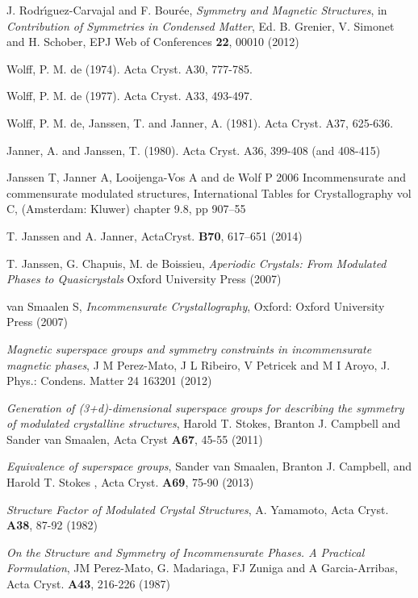 \documentclass[10pt]{article}
\begin{document}
\begin{thebibliography}{999}
	 J. Rodr\'{\i}guez-Carvajal and F. Bour\'ee, {\it Symmetry and Magnetic Structures}, in {\it Contribution of Symmetries in Condensed Matter}, Ed. B. Grenier, V. Simonet and H. Schober, EPJ Web of Conferences {\bf 22}, 00010 (2012)%

 Wolff, P. M. de (1974). Acta Cryst. A30, 777-785.

 Wolff, P. M. de (1977). Acta Cryst. A33, 493-497.

 Wolff, P. M. de, Janssen, T. and Janner, A. (1981). Acta Cryst. A37, 625-636.

   Janner, A. and Janssen, T. (1980). Acta Cryst. A36, 399-408 (and 408-415)


  Janssen T, Janner A, Looijenga-Vos A and de Wolf P 2006
Incommensurate and commensurate modulated structures, International Tables for Crystallography vol C,
(Amsterdam: Kluwer) chapter 9.8, pp 907–55

 T. Janssen and A. Janner,  ActaCryst.  {\bf B70}, 617–651 (2014)

 T. Janssen, G. Chapuis, M. de Boissieu, {\it Aperiodic Crystals:  From Modulated Phases to Quasicrystals} Oxford University Press (2007)

 van Smaalen S, {\it Incommensurate Crystallography}, Oxford: Oxford University Press (2007)

 {\it Magnetic superspace groups and symmetry constraints in incommensurate magnetic phases}, J M Perez-Mato, J L Ribeiro, V Petricek and M I Aroyo,  J. Phys.: Condens. Matter 24
163201 (2012)

 {\it Generation of (3+d)-dimensional superspace groups for describing the symmetry of modulated crystalline structures}, Harold T. Stokes, Branton J. Campbell and Sander van Smaalen, Acta Cryst {\bf A67}, 45-55 (2011)
	
 {\it Equivalence of superspace groups}, Sander van Smaalen, Branton J. Campbell, and Harold T. Stokes , Acta Cryst. {\bf A69}, 75-90 (2013)

 {\it Structure Factor of Modulated Crystal Structures}, A. Yamamoto, Acta Cryst. {\bf A38}, 87-92 (1982)

 {\it On the Structure and Symmetry of Incommensurate Phases. A Practical Formulation}, JM Perez-Mato, G. Madariaga, FJ Zuniga and A Garcia-Arribas, Acta Cryst. {\bf A43}, 216-226 (1987)

\end{thebibliography}		
		
\end{document}
